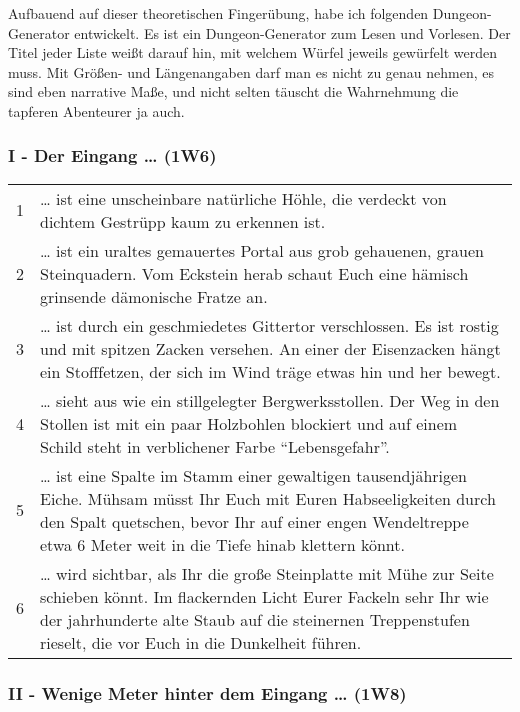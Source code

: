\documentclass[11pt]{wbzine}
\begin{document}
Aufbauend auf dieser theoretischen Fingerübung, habe ich folgenden
Dungeon-Generator entwickelt. Es ist ein Dungeon-Generator zum
Lesen und Vorlesen. Der Titel jeder Liste weißt darauf hin, mit
welchem Würfel jeweils gewürfelt werden muss. Mit Größen- und
Längenangaben darf man es nicht zu genau nehmen, es sind eben
narrative Maße, und nicht selten täuscht die Wahrnehmung die
tapferen Abenteurer ja auch.

\subsubsection{I - Der Eingang \ldots{} (1W6)}

\begin{tabularx}{\columnwidth}{cZ}
1 &  \ldots{} ist eine unscheinbare natürliche Höhle, die verdeckt von
  dichtem Gestrüpp kaum zu erkennen ist.\\
2 & \ldots{} ist ein uraltes gemauertes Portal aus grob gehauenen, grauen
  Steinquadern. Vom Eckstein herab schaut Euch eine hämisch grinsende
  dämonische Fratze an.\\
3 &  \ldots{} ist durch ein geschmiedetes Gittertor verschlossen. Es ist
  rostig und mit spitzen Zacken versehen. An einer der Eisenzacken hängt
  ein Stofffetzen, der sich im Wind träge etwas hin und her
  bewegt.\\
4 &  \ldots{} sieht aus wie ein stillgelegter Bergwerksstollen. Der Weg in
  den Stollen ist mit ein paar Holzbohlen blockiert und auf einem Schild
  steht in verblichener Farbe ``Lebensgefahr''.\\
5 &  \ldots{} ist eine Spalte im Stamm einer gewaltigen tausendjährigen
  Eiche. Mühsam müsst Ihr Euch mit Euren Habseeligkeiten durch den Spalt
  quetschen, bevor Ihr auf einer engen Wendeltreppe etwa 6 Meter weit in
  die Tiefe hinab klettern könnt.\\
6 &  \ldots{} wird sichtbar, als Ihr die große Steinplatte mit Mühe zur
  Seite schieben könnt. Im flackernden Licht Eurer Fackeln sehr Ihr wie
  der jahrhunderte alte Staub auf die steinernen Treppenstufen rieselt,
  die vor Euch in die Dunkelheit führen.\\
\end{tabularx}

\subsubsection{II - Wenige Meter hinter dem Eingang \ldots{} (1W8)}
\end{document}
